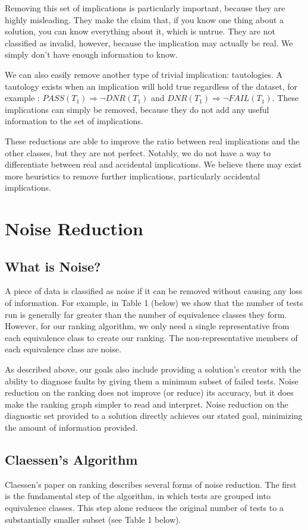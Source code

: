 \documentclass[11pt,twoside]{article}
\newcommand\dnr{\ensuremath{\mathit{DNR}}}
\newcommand\fail{\mathit{FAIL}}
\newcommand\pass{\mathit{PASS}}
\theoremstyle{definition}
\begin{document}
Removing this set of implications is particularly important, because they are highly misleading. They make the claim that, if you know one thing about a solution, you can know everything about it, which is untrue. They are not classified as invalid, however, because the implication may actually be real. We simply don't have enough information to know.

We can also easily remove another type of trivial implication: tautologies. A tautology exists when an implication will hold true regardless of the dataset, for example : $\pass(T_1) \Rightarrow \neg\dnr(T_1)$ and $\dnr(T_1) \Rightarrow \neg\fail(T_1)$. These implications can simply be removed, because they do not add any useful information to the set of implications.

These reductions are able to improve the ratio between real implications and the other classes, but they are not perfect. Notably, we do not have a way to differentiate between real and accidental implications. We believe there may exist more heuristics to remove further implications, particularly accidental implications.

\section{Noise Reduction}

\subsection{What is Noise?}
A piece of data is classified as noise if it can be removed without causing any loss of information. For example, in Table 1 (below) we show that the number of tests run is generally far greater than the number of equivalence classes they form. However, for our ranking algorithm, we only need a single representative from each equivalence class to create our ranking. The non-representative members of each equivalence class are noise. 

As described above, our goals also include providing a solution's creator with the ability to diagnose faults by giving them a minimum subset of failed tests. Noise reduction on the ranking does not improve (or reduce) its accuracy, but it does make the ranking graph simpler to read and interpret. Noise reduction on the diagnostic set provided to a solution directly achieves our stated goal, minimizing the amount of information provided.


\subsection{Claessen's Algorithm}
Claessen's paper on ranking describes several forms of noise reduction. The first is the fundamental step of the algorithm, in which tests are grouped into equivalence classes. This step alone reduces the original number of tests to a substantially smaller subset (see Table 1 below).
\end{document}
